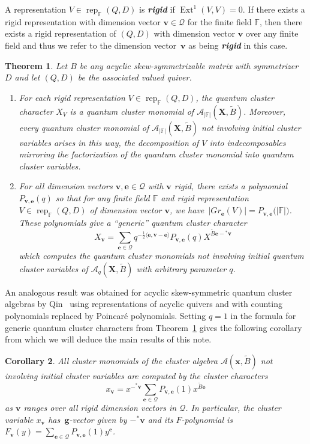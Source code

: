 \documentclass[pdftex]{sigma}
\newcommand{\bfe}{\mathbf{e}}
\newcommand{\bfg}{\mathbf{g}}
\newcommand{\bfv}{\mathbf{v}}
\newcommand{\bfx}{\mathbf{x}}
\newcommand{\bfX}{\mathbf{X}}
\newcommand{\cA}{\mathcal{A}}
\newcommand{\cQ}{\mathcal{Q}}
\newcommand{\FF}{\mathbb{F}}
\newcommand{\Ext}{\operatorname{Ext}}
\newcommand{\half}{{\frac{1}{2}}}
\newcommand{\rep}{\operatorname{rep}}
\newcommand{\newword}[1]{\textbf{\emph{#1}}}
\newenvironment{enumeratea}{\begin{enumerate}[\upshape (a)]}{\end{enumerate}}
\newtheorem{Theorem}{Theorem}
\newtheorem{Corollary}[Theorem]{Corollary}
\begin{document}
  A representation $V\in\rep_\FF(Q,D)$ is \newword{rigid} if $\Ext^1(V,V)=0$.
  If there exists a rigid representation with dimension vector $\bfv\in\cQ$ for the finite field $\FF$, then there exists a rigid representation of $(Q,D)$ with dimension vector $\bfv$ over any finite field and thus we refer to the dimension vector~$\bfv$ as being \newword{rigid} in this case.
  \begin{Theorem}\cite{rupel1,rupel2}
    \label{th:quantum cluster characters}
    Let $B$ be any acyclic skew-symmetrizable matrix with symmetrizer $D$ and let $(Q,D)$ be the associated valued quiver.
    \begin{enumeratea}
      \item 
        For each rigid representation $V\in\rep_\FF(Q,D)$, the quantum cluster character $X_V$ is a quantum cluster monomial of $\cA_{|\FF|}(\bfX,\widetilde{B})$.  
        Moreover, every quantum cluster monomial of $\cA_{|\FF|}(\bfX,\widetilde{B})$ not involving initial cluster variables arises in this way, the decomposition of $V$ into indecomposables mirroring the factorization of the quantum cluster monomial into quantum cluster variables.
      
      \item 
        For all dimension vectors $\bfv,\bfe\in\cQ$ with $\bfv$ rigid, there exists a polynomial $P_{\bfv,\bfe}(q)$ so that for any finite field $\FF$ and rigid representation $V\in\rep_\FF(Q,D)$ of dimension vector $\bfv$, we have~$\big|Gr_\bfe(V)\big|=P_{\bfv,\bfe}\big(|\FF|\big)$.
        These polynomials give a ``generic'' quantum cluster character 
        \[
          X_\bfv=\sum\limits_{\bfe\in\cQ} q^{-\half\langle\bfe,\bfv-\bfe\rangle}P_{\bfv,\bfe}(q)X^{\widetilde{B}\bfe-{}^*\bfv}
        \]
        which computes the quantum cluster monomials not involving initial quantum cluster variables of $\cA_q(\bfX,\widetilde{B})$ with arbitrary parameter $q$.
    \end{enumeratea}
  \end{Theorem}
  An analogous result was obtained for acyclic skew-symmetric quantum cluster algebras by Qin~\cite{qin} using representations of acyclic quivers and with counting polynomials replaced by Poincar\'e polynomials.
  Setting $q=1$ in the formula for generic quantum cluster characters from Theorem~\ref{th:quantum cluster characters} gives the following corollary from which we will deduce the main results of this note.
  \begin{Corollary}
    \label{cor:classical cluster characters}
    All cluster monomials of the cluster algebra $\cA(\bfx,\widetilde{B})$ not involving initial cluster variables are computed by the cluster characters
    \[
      x_\bfv
      =
      x^{-{}^*\bfv}\sum\limits_{\bfe\in\cQ} P_{\bfv,\bfe}(1)x^{\widetilde{B}\bfe}
    \]
    as $\bfv$ ranges over all rigid dimension vectors in $\cQ$.
    In particular, the cluster variable $x_\bfv$ has~$\bfg$-vector given by $-{}^*\bfv$ and its $F$-polynomial is $F_\bfv(y)=\sum\limits_{\bfe\in\cQ} P_{\bfv,\bfe}(1)y^\bfe$.
  \end{Corollary}
\end{document}
